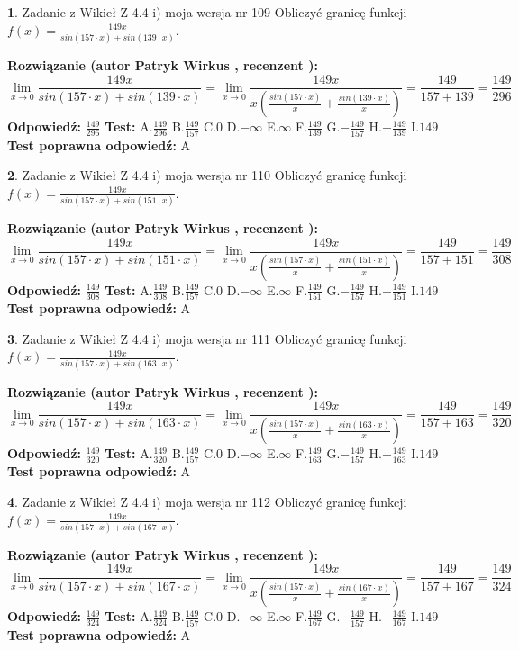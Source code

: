 \documentclass[12pt, a4paper]{article}
\theoremstyle{definition} %
\newtheorem{zad}{}
\newcommand{\zadStart}[1]{\begin{zad}#1\newline}
\newcommand{\zadStop}{\end{zad}}
\newcommand{\rozwStart}[2]{\noindent \textbf{Rozwiązanie (autor #1 , recenzent #2): }\newline}
\newcommand{\rozwStop}{\newline}
\newcommand{\odpStart}{\noindent \textbf{Odpowiedź:}\newline}
\newcommand{\odpStop}{\newline}
\newcommand{\testStart}{\noindent \textbf{Test:}\newline}
\newcommand{\testStop}{\newline}
\newcommand{\kluczStart}{\noindent \textbf{Test poprawna odpowiedź:}\newline}
\newcommand{\kluczStop}{\newline}
\begin{document}
\zadStart{Zadanie z Wikieł Z 4.4 i) moja wersja nr 109}
Obliczyć granicę funkcji $f(x)=\frac{149x}{sin(157\cdot x) +sin(139\cdot x)}$.
\zadStop
\rozwStart{Patryk Wirkus}{}
$$\lim\limits_{x\to 0}\frac{149x}{sin(157\cdot x) +sin(139\cdot x)}=\lim\limits_{x\to 0}\frac{149x}{x(\frac{sin(157\cdot x)}{x}+\frac{sin(139\cdot x)}{x})}=\frac{149}{157+139} = \frac{149}{296}$$
\rozwStop
\odpStart
$\frac{149}{296}$
\odpStop
\testStart
A.$\frac{149}{296}$
B.$\frac{149}{157}$
C.$0$
D.$-\infty$
E.$\infty$
F.$\frac{149}{139}$
G.$-\frac{149}{157}$
H.$-\frac{149}{139}$
I.$149$
\testStop
\kluczStart
A
\kluczStop



\zadStart{Zadanie z Wikieł Z 4.4 i) moja wersja nr 110}
Obliczyć granicę funkcji $f(x)=\frac{149x}{sin(157\cdot x) +sin(151\cdot x)}$.
\zadStop
\rozwStart{Patryk Wirkus}{}
$$\lim\limits_{x\to 0}\frac{149x}{sin(157\cdot x) +sin(151\cdot x)}=\lim\limits_{x\to 0}\frac{149x}{x(\frac{sin(157\cdot x)}{x}+\frac{sin(151\cdot x)}{x})}=\frac{149}{157+151} = \frac{149}{308}$$
\rozwStop
\odpStart
$\frac{149}{308}$
\odpStop
\testStart
A.$\frac{149}{308}$
B.$\frac{149}{157}$
C.$0$
D.$-\infty$
E.$\infty$
F.$\frac{149}{151}$
G.$-\frac{149}{157}$
H.$-\frac{149}{151}$
I.$149$
\testStop
\kluczStart
A
\kluczStop



\zadStart{Zadanie z Wikieł Z 4.4 i) moja wersja nr 111}
Obliczyć granicę funkcji $f(x)=\frac{149x}{sin(157\cdot x) +sin(163\cdot x)}$.
\zadStop
\rozwStart{Patryk Wirkus}{}
$$\lim\limits_{x\to 0}\frac{149x}{sin(157\cdot x) +sin(163\cdot x)}=\lim\limits_{x\to 0}\frac{149x}{x(\frac{sin(157\cdot x)}{x}+\frac{sin(163\cdot x)}{x})}=\frac{149}{157+163} = \frac{149}{320}$$
\rozwStop
\odpStart
$\frac{149}{320}$
\odpStop
\testStart
A.$\frac{149}{320}$
B.$\frac{149}{157}$
C.$0$
D.$-\infty$
E.$\infty$
F.$\frac{149}{163}$
G.$-\frac{149}{157}$
H.$-\frac{149}{163}$
I.$149$
\testStop
\kluczStart
A
\kluczStop



\zadStart{Zadanie z Wikieł Z 4.4 i) moja wersja nr 112}
Obliczyć granicę funkcji $f(x)=\frac{149x}{sin(157\cdot x) +sin(167\cdot x)}$.
\zadStop
\rozwStart{Patryk Wirkus}{}
$$\lim\limits_{x\to 0}\frac{149x}{sin(157\cdot x) +sin(167\cdot x)}=\lim\limits_{x\to 0}\frac{149x}{x(\frac{sin(157\cdot x)}{x}+\frac{sin(167\cdot x)}{x})}=\frac{149}{157+167} = \frac{149}{324}$$
\rozwStop
\odpStart
$\frac{149}{324}$
\odpStop
\testStart
A.$\frac{149}{324}$
B.$\frac{149}{157}$
C.$0$
D.$-\infty$
E.$\infty$
F.$\frac{149}{167}$
G.$-\frac{149}{157}$
H.$-\frac{149}{167}$
I.$149$
\testStop
\kluczStart
A
\kluczStop
\end{document}
